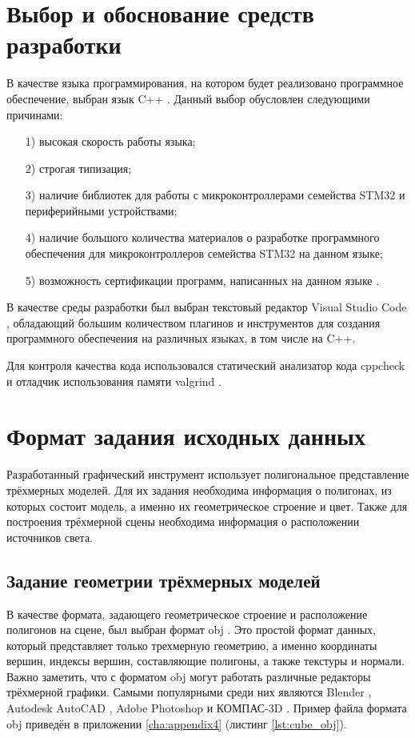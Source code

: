 \section{Выбор и обоснование средств разработки}
В качестве языка программирования, на котором будет реализовано программное обеспечение, выбран язык C++ \cite{cpp}.
Данный выбор обусловлен следующими причинами:
\begin{enumerate}
	\item[1)] высокая скорость работы языка;
	\item[2)] строгая типизация;
	\item[3)] наличие библиотек для работы с микроконтроллерами семейства STM32 и периферийными устройствами;
	\item[4)] наличие большого количества материалов о разработке программного обеспечения для микроконтроллеров семейства STM32 на данном языке;
	\item[5)] возможность сертификации программ, написанных на данном языке \cite{fstec}.
\end{enumerate}

В качестве среды разработки был выбран текстовый редактор Visual Studio Code \cite{vscode}, обладающий большим количеством плагинов 
и инструментов для создания программного обеспечения на различных языках, в том числе на C++.

Для контроля качества кода использовался статический анализатор кода cppcheck \cite{cppcheck} и отладчик использования памяти 
valgrind \cite{valgrind}.



\section{Формат задания исходных данных}
Разработанный графический инструмент использует полигональное представление трёхмерных моделей. Для их задания необходима информация 
о полигонах, из которых состоит модель, а именно их геометрическое строение и цвет. Также для построения трёхмерной сцены необходима 
информация о расположении источников света.

\subsection{Задание геометрии трёхмерных моделей}
В качестве формата, задающего геометрическое строение и расположение полигонов на сцене, был выбран формат obj \cite{obj}. Это  простой 
формат данных, который представляет только трехмерную геометрию, а именно координаты вершин, индексы вершин, 
составляющие полигоны, а также текстуры и нормали. Важно заметить, что с форматом obj могут работать различные редакторы 
трёхмерной графики. Самыми популярными среди них являются Blender \cite{blender}, Autodesk AutoCAD \cite{autocad}, 
Adobe Photoshop \cite{photoshop} и КОМПАС-3D \cite{compass}. Пример файла формата obj приведён в приложении \ref{cha:appendix4} 
(листинг \ref{lst:cube_obj}).

